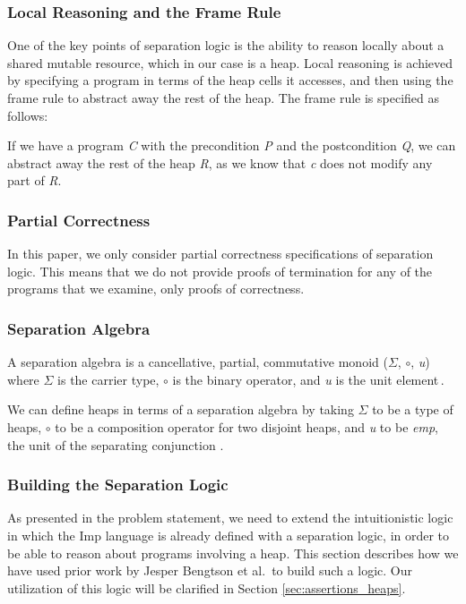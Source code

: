 \subsubsection{Local Reasoning and the Frame Rule}
One of the key points of separation logic is the ability to reason locally about a shared mutable resource, which in our case is a heap. Local reasoning is achieved by specifying a program in terms of the heap cells  it accesses, and then using the frame rule to abstract away the rest of the heap. The frame rule is specified as follows:

\begin{prooftree}
\end{prooftree}

If we have a program {\it C} with the precondition {\it P} and the postcondition {\it Q}, we can abstract away the rest of the heap {\it R}, as we know that {\it c} does not modify any part of {\it R}.

\subsubsection{Partial Correctness}
In this paper, we only consider partial correctness specifications of separation logic. This means that we do not provide proofs of termination for any of the programs that we examine, only proofs of correctness.


\subsubsection{Separation Algebra}
A separation algebra is a cancellative, partial, commutative monoid ($\Sigma$, $\circ$, {\it u}) where $\Sigma$ is the carrier type, $\circ$ is the binary operator, and {\it u} is the unit element\,\cite{Calcagno07:LCS}.

We can define heaps in terms of a separation algebra by taking $\Sigma$ to be a type of heaps, $\circ$ to be a composition operator for two disjoint heaps, and {\it u} to be {\it emp}, the unit of the separating conjunction \cite{BirkedalL:veroop-conf}.

\subsubsection{Building the Separation Logic}
As presented in the problem statement, we need to extend the intuitionistic logic in which the Imp language is already defined with a separation logic, in order to be able to reason about programs involving a heap. This section describes how we have used prior work by Jesper Bengtson et al.\,\cite{BirkedalL:veroop-conf} to build such a logic. Our utilization of this logic will be clarified in Section \ref{sec:assertions_heaps}.

